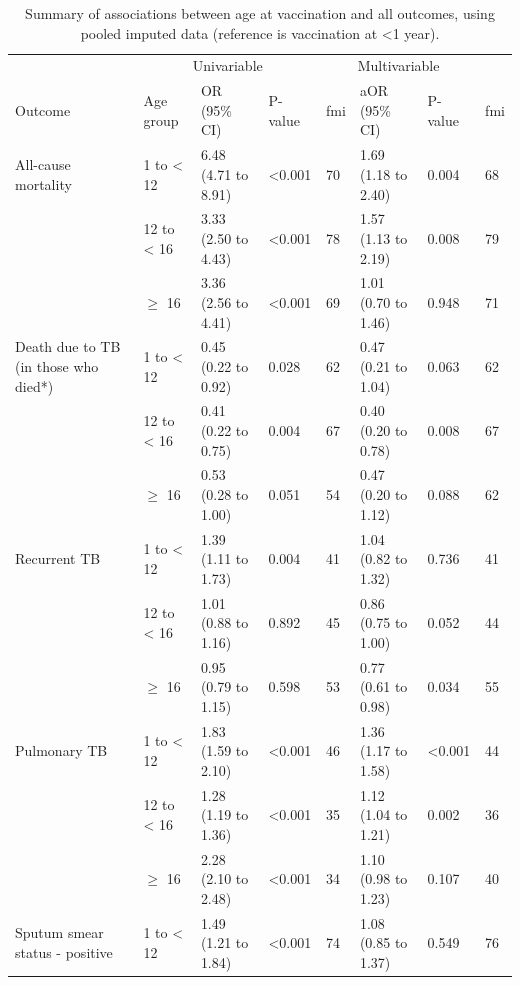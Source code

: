 \documentclass[11pt,twoside]{bristolthesis}
\begin{document}
  \begin{table}[H]
  
  \caption[Summary of associations between age at vaccination and all outcomes, using pooled imputed data (reference is vaccination at <1 year).]{\label{tab:06-imp-ageatvac}Summary of associations between age at vaccination and all outcomes, using pooled imputed data (reference is vaccination at <1 year).}
  \centering
  \fontsize{8}{10}\selectfont
  \begin{tabular}{>{\raggedright\arraybackslash}p{3cm}lllllll}
  \toprule
  \multicolumn{2}{c}{ } & \multicolumn{3}{c}{Univariable} & \multicolumn{3}{c}{Multivariable} \\
  \cmidrule(l{3pt}r{3pt}){3-5} \cmidrule(l{3pt}r{3pt}){6-8}
  Outcome & Age group & OR (95\% CI) & P-value & fmi & aOR (95\% CI) & P-value & fmi\\
  \midrule
  All-cause mortality & 1 to < 12 & 6.48 (4.71 to 8.91) & <0.001 & 70 & 1.69 (1.18 to 2.40) & 0.004 & 68\\
   & 12 to < 16 & 3.33 (2.50 to 4.43) & <0.001 & 78 & 1.57 (1.13 to 2.19) & 0.008 & 79\\
   & $\geq$ 16 & 3.36 (2.56 to 4.41) & <0.001 & 69 & 1.01 (0.70 to 1.46) & 0.948 & 71\\
  Death due to TB (in those who died*) & 1 to < 12 & 0.45 (0.22 to 0.92) & 0.028 & 62 & 0.47 (0.21 to 1.04) & 0.063 & 62\\
   & 12 to < 16 & 0.41 (0.22 to 0.75) & 0.004 & 67 & 0.40 (0.20 to 0.78) & 0.008 & 67\\
  \addlinespace
   & $\geq$ 16 & 0.53 (0.28 to 1.00) & 0.051 & 54 & 0.47 (0.20 to 1.12) & 0.088 & 62\\
  Recurrent TB & 1 to < 12 & 1.39 (1.11 to 1.73) & 0.004 & 41 & 1.04 (0.82 to 1.32) & 0.736 & 41\\
   & 12 to < 16 & 1.01 (0.88 to 1.16) & 0.892 & 45 & 0.86 (0.75 to 1.00) & 0.052 & 44\\
   & $\geq$ 16 & 0.95 (0.79 to 1.15) & 0.598 & 53 & 0.77 (0.61 to 0.98) & 0.034 & 55\\
  Pulmonary TB & 1 to < 12 & 1.83 (1.59 to 2.10) & <0.001 & 46 & 1.36 (1.17 to 1.58) & <0.001 & 44\\
  \addlinespace
   & 12 to < 16 & 1.28 (1.19 to 1.36) & <0.001 & 35 & 1.12 (1.04 to 1.21) & 0.002 & 36\\
   & $\geq$ 16 & 2.28 (2.10 to 2.48) & <0.001 & 34 & 1.10 (0.98 to 1.23) & 0.107 & 40\\
  Sputum smear status - positive & 1 to < 12 & 1.49 (1.21 to 1.84) & <0.001 & 74 & 1.08 (0.85 to 1.37) & 0.549 & 76\\

\end{tabular}
\end{table}
\end{document}
